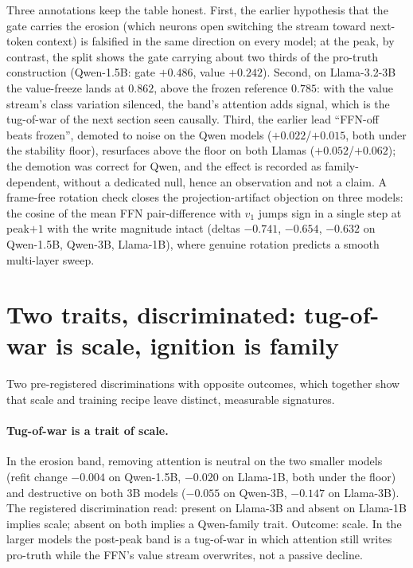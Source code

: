 \documentclass[11pt]{article}
\begin{document}
Three annotations keep the table honest. First, the earlier hypothesis that
the gate carries the erosion (which neurons open switching the stream
toward next-token context) is falsified in the same direction on every
model; at the peak, by contrast, the split shows the gate carrying about
two thirds of the pro-truth construction (Qwen-1.5B: gate $+0.486$, value
$+0.242$). Second, on Llama-3.2-3B the value-freeze lands at $0.862$, above
the frozen reference $0.785$: with the value stream's class variation
silenced, the band's attention adds signal, which is the tug-of-war of the
next section seen causally. Third, the earlier lead ``FFN-off beats
frozen'', demoted to noise on the Qwen models ($+0.022$/$+0.015$, both
under the stability floor), resurfaces above the floor on both Llamas
($+0.052$/$+0.062$); the demotion was correct for Qwen, and the effect is
recorded as family-dependent, without a dedicated null, hence an
observation and not a claim. A frame-free rotation check closes the
projection-artifact objection on three models: the cosine of the mean FFN
pair-difference with $v_1$ jumps sign in a single step at peak$+1$ with the
write magnitude intact (deltas $-0.741$, $-0.654$, $-0.632$ on Qwen-1.5B,
Qwen-3B, Llama-1B), where genuine rotation predicts a smooth multi-layer
sweep.

\section{Two traits, discriminated: tug-of-war is scale, ignition is family}
\label{b:sec:traits}

Two pre-registered discriminations with opposite outcomes, which together
show that scale and training recipe leave distinct, measurable signatures.

\paragraph{Tug-of-war is a trait of scale.} In the erosion band, removing
attention is neutral on the two smaller models (refit change $-0.004$ on
Qwen-1.5B, $-0.020$ on Llama-1B, both under the floor) and destructive on
both 3B models ($-0.055$ on Qwen-3B, $-0.147$ on Llama-3B). The registered
discrimination read: present on Llama-3B and absent on Llama-1B implies
scale; absent on both implies a Qwen-family trait. Outcome: scale. In the
larger models the post-peak band is a tug-of-war in which attention still
writes pro-truth while the FFN's value stream overwrites, not a passive
decline.
\end{document}
